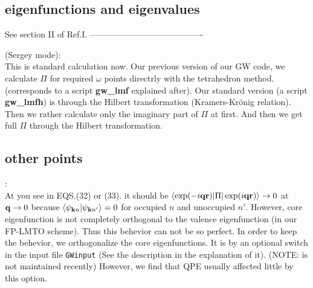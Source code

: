 \documentclass[a4paper,10pt,epsf,fleqn]{article}
\newcommand{\keyw}[1]{\fbox{\tt #1}}
\newcommand{\bfq}{{\bf q}}
\newcommand{\bfk}{{\bf k}}
\newcommand{\bfr}{{\bf r}}
\begin{document}
\subsection{eigenfunctions and eigenvalues}
See section II of Ref.I. 
----------------------------------------\\
\vspace{1cm}

\vspace{1cm}
 (Sergey mode):\\
This is standard calculation now.
Our previous version of our GW code, we calculate $\Pi$ 
for required $\omega$ points directrly with the tetrahedron method. 
(corresponds to a script {\bf gw\_lmf} explained after).
Our standard version (a script {\bf gw\_lmfh}) is through
the Hilbert transformation (Kramers-Kr\"onig relation).
Then we rather calculate only the imaginary part of $\Pi$
at first. And then we get full $\Pi$ through the Hilbert transformation.



\subsection{other points}
:\\
At you see in EQS.(32) or (33).
it should be $\langle \exp(-i \bfq \bfr) | \Pi | \exp(i \bfq \bfr) \rangle \to 0$ 
at $\bfq \to 0$ because $\langle \psi_{\bfk n} | \psi_{\bfk n'}\rangle=0$
for occupied $n$ and unoccupied $n'$.
However, core eigenfunction is not completely orthogonal
to the valence eigenfunction (in our FP-LMTO scheme). 
Thus this behevior can not be so perfect.
In order to keep the behevior, we orthogonalize
the core eigenfunctions. It is by an optional switch
\keyw{CoreOrth} in the input file {\tt GWinput}
(See the description in the explanation of it). 
(NOTE:\keyw{CoreOrth}  is not maintained recently)
However, we find that QPE  usually affected little by this option.
\end{document}
